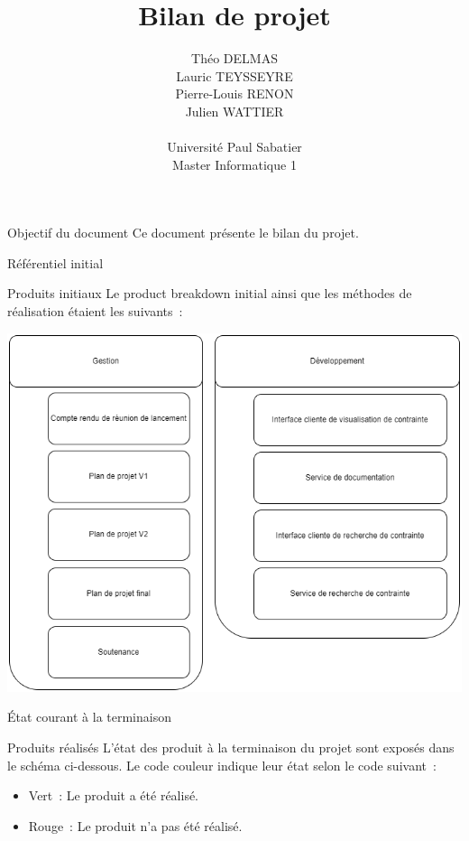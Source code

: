 \documentclass[]{article}
\title{Bilan de projet}
\author{
    Théo DELMAS\\
    Lauric TEYSSEYRE\\
    Pierre-Louis RENON\\
    Julien WATTIER\\
    \\
    Université Paul Sabatier\\
    Master Informatique 1\\
   }
\begin{document}
\maketitle
\newpage
\tableofcontents
\newpage

\begin{section}{Objectif du document}
 Ce document présente le bilan du projet.
\end{section}

{
\setlength{\parindent}{0pt} %
\begin{section}{Référentiel initial}
 \begin{subsection}{Produits initiaux}
     Le product breakdown initial ainsi que les méthodes de réalisation étaient les suivants :

     \includegraphics[scale=0.5]{IMG/PBS_initial_bilan}
 \end{subsection}
\end{section}

\begin{section}{État courant à la terminaison}
 \begin{subsection}{Produits réalisés}
     L’état des produit à la terminaison du projet sont exposés dans le schéma ci-dessous. Le code couleur indique leur état selon le code suivant :

     \begin{itemize}
         \item Vert : Le produit a été réalisé.
         \item Rouge : Le produit n’a pas été réalisé.
     \end{itemize}


\end{subsection}
\end{section}}
\end{document}
